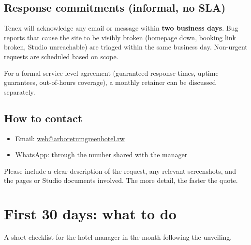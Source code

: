 \documentclass[11pt,a4paper]{article}
\begin{document}
\subsection{Response commitments (informal, no SLA)}

Tenex will acknowledge any email or message within \textbf{two business days}. Bug reports that cause the site to be visibly broken (homepage down, booking link broken, Studio unreachable) are triaged within the same business day. Non-urgent requests are scheduled based on scope.

For a formal service-level agreement (guaranteed response times, uptime guarantees, out-of-hours coverage), a monthly retainer can be discussed separately.

\subsection{How to contact}

\begin{itemize}
\item Email: \href{mailto:web@arboretumgreenhotel.rw}{web@arboretumgreenhotel.rw}
\item WhatsApp: through the number shared with the manager
\end{itemize}

Please include a clear description of the request, any relevant screenshots, and the pages or Studio documents involved. The more detail, the faster the quote.

\section{First 30 days: what to do}

A short checklist for the hotel manager in the month following the unveiling.
\end{document}
